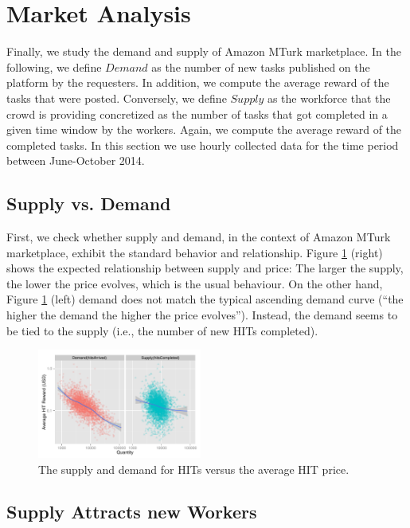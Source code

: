 \section{Market Analysis}
\label{sec:market}
Finally, we study the demand and supply of Amazon MTurk marketplace. In the following, we define $Demand$ as the number of new tasks published on the platform by the requesters. In addition, we compute the average reward of the tasks that were posted. Conversely, we define $Supply$ as the workforce that the crowd is providing concretized as the number of tasks that got completed in a given time window by the workers. Again, we compute the average reward of the completed tasks.
In this section we use hourly collected data for the time period between June-October 2014.

\subsection{Supply vs. Demand}
First, we check whether supply and demand, in the context of Amazon MTurk marketplace, exhibit the standard behavior and relationship.
Figure \ref{fig:dsup} (right) shows the expected relationship between supply and price: The larger the supply, the lower the price evolves, which is the usual behaviour. On the other hand, Figure \ref{fig:dsup} (left) demand does not match the typical ascending demand curve (``the higher the demand the higher the price evolves''). Instead, the demand seems to be tied to the supply (i.e., the number of new HITs completed).

\begin{figure}[tb]
	\centering
		\includegraphics[width=0.48\textwidth]{figures/ds}
	\caption{The supply and demand for HITs versus the average HIT price.}
	\label{fig:dsup}
\end{figure}

\subsection{Supply Attracts new Workers} %

